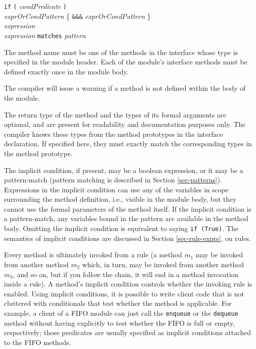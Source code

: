 \documentclass[twoside,letterpaper]{article}
\newcommand{\hm}{\hspace*{1em}}
\newcommand{\nterm}[1]{\emph{#1}}
\newcommand{\term}[1]{\texttt{#1}}
\newcommand{\many}[1]{\{ #1 \}}
\newcommand{\alt}{{$\mid$}}
\newcommand{\gram}[2]{    \hm\makebox[10em][l]{\it #1}\makebox[1.5em][l]{::=}    #2}
\newcommand{\gramalt}[1]{ \hm\makebox[10em][l]{      }\makebox[1.5em][l]{\alt}   #1}
\begin{document}
\gram{implicitCond}{\term{if} \term{(} \nterm{condPredicate} \term{)}} \\
\gram{condPredicate}{ \nterm{exprOrCondPattern}
                      \many{ \term{\&\&\&} \nterm{exprOrCondPattern} } } \\
\gram{exprOrCondPattern}{ \nterm{expression} } \\
\gramalt                { \nterm{expression} \term{matches} \nterm{pattern} }

The method name must be one of the methods in the interface whose type
is specified in the module header.  Each of the module's interface
methods must be defined exactly once in the module body.

The compiler
will issue a warning if a method is not defined within the body of the module.

The return type of the method and the types of its formal arguments
are optional, and are present for readability and documentation
purposes only.  The compiler knows these types from the method
prototypes in the interface declaration.  If specified here, they must
exactly match the corresponding types in the method prototype.


The implicit condition, if present, may be a boolean expression, or it
may be a pattern-match (pattern matching is described in Section
{\ref{sec-patterns}}).  Expressions in the implicit condition can use
any of the variables in scope surrounding the method definition, i.e.,
visible in the module body, but they cannot use the formal parameters
of the method itself.  If the implicit condition is a pattern-match,
any variables bound in the pattern are available in the method body.
Omitting the implicit condition is equivalent to saying \mbox{\texttt{if
(True)}}.  The semantics of implicit conditions are discussed in
Section \ref{sec-rule-exprs}, on rules.

Every method is ultimately invoked from a rule (a method $m_1$ may be
invoked from another method $m_2$ which, in turn, may be invoked from
another method $m_3$, and so on, but if you follow the chain, it will
end in a method invocation inside a rule).  A method's implicit
condition controls whether the invoking rule is enabled.  Using
implicit conditions, it is possible to write client code that is not
cluttered with conditionals that test whether the method is
applicable.  For example, a client of a FIFO module can just call the
\texttt{enqueue} or the \texttt{dequeue} method without having explicitly to
test whether the FIFO is full or empty, respectively; those predicates
are usually specified as implicit conditions attached to the FIFO
methods.
\end{document}
